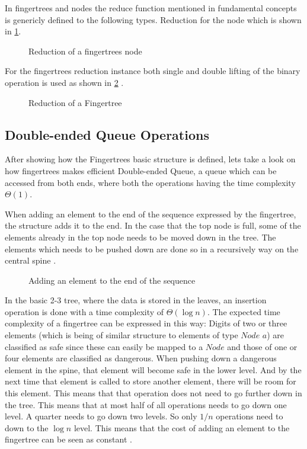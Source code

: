 In fingertrees and nodes the reduce function mentioned in fundamental concepts
is genericly defined to the following types. 
Reduction for the node which is shown in \cref{fig:reductionNode}.

\begin{figure}[h!]

\caption{Reduction of a fingertrees node \label{fig:reductionNode}}
\end{figure}

For the fingertrees reduction instance both single and double lifting of the binary
operation is used as shown in \cref{fig:reductionFingerTree} \cite{fingertree}.

\begin{figure}[h!]

\caption{Reduction of a Fingertree \label{fig:reductionFingerTree}}
\end{figure}

\subsection{Double-ended Queue Operations}
After showing how the Fingertrees basic structure is defined, lets take a look
on how fingertrees makes efficient Double-ended Queue, a queue which can be
accessed from both ends, where both the operations having the time complexity
$\Theta(1)$.

When adding an element to the end of the sequence expressed by the fingertree,
the structure adds it to the end. In the case that the top node is full, some
of the elements already in the top node needs to be moved down in the tree.
The elements which needs to be pushed down are done so in a recursively way on
the central spine \cite{fingertree}. 

\begin{figure}[h!]

\caption{Adding an element to the end of the sequence \label{fig:AddLast}}
\end{figure}

In the basic 2-3 tree, where the data is stored in the leaves, an insertion
operation is done with a time complexity of $\Theta (\log n)$. The expected 
time complexity of a fingertree can be expressed in this way:
Digits of two or three elements (which is being of similar structure to elements
of type $Node$ $a$) are classified as safe since these can easily be mapped to a
$Node$ and those of one or four elements are classified as dangerous. When
pushing down a dangerous element in the spine, that element will become safe
in the lower level. And by the next time that element is called to store
another element, there will be room for this element. This means that that
operation does not need to go further down in the tree. This means that at
most half of all operations needs to go down one level. A quarter needs to go
down two levels. So only $1/n$ operations need to down to the $\log n$ level.
This means that the cost of adding an element to the fingertree can be seen as
constant \cite{fingertree}.  

